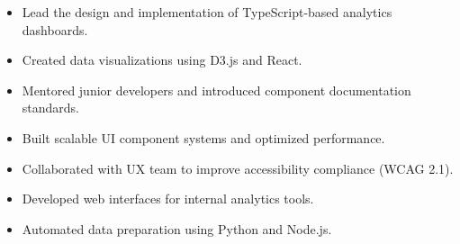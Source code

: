
\begin{itemize}
  \item Lead the design and implementation of TypeScript-based analytics dashboards.
  \item Created data visualizations using D3.js and React.
  \item Mentored junior developers and introduced component documentation standards.
\end{itemize}

\divider

\begin{itemize}
  \item Built scalable UI component systems and optimized performance.
  \item Collaborated with UX team to improve accessibility compliance (WCAG 2.1).
\end{itemize}

\divider

\begin{itemize}
  \item Developed web interfaces for internal analytics tools.
  \item Automated data preparation using Python and Node.js.
\end{itemize}
